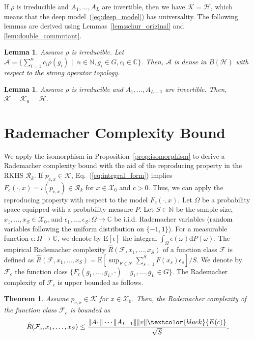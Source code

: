 \documentclass[twoside]{article}
\newtheorem{lemma}[proposition]{Lemma}
\newtheorem{theorem}[proposition]{Theorem}
\def\mcl#1{\mathcal{#1}}
\def\hil{\mcl{H}}
\def\mr{\mathrm}
\def\alg{\mcl{A}}
\def\red#1{\textcolor{black}{#1}}
\def\eqref#1{(\ref{#1})}
\begin{document}
If $\rho$ is irreducible and $A_1,\ldots,A_L$ are invertible, then we have $\mcl{K}=\hil$, which means that the deep model~\eqref{eq:deep_model} has universality.
The following lemmas are derived using Lemmas~\ref{lem:schur_original} and \ref{lem:double_commutant}.
\begin{lemma}\label{lem:schur}
Assume $\rho$ is irreducible.
Let $\alg=\{\sum_{i=1}^nc_i\rho(g_i)\,\mid\,n\in\mathbb{N}, g_i\in G, c_i\in\mathbb{C}\}$. 
Then, $\alg$ is dense in $B(\hil)$ with respect to the strong operator topology.
\end{lemma}

\begin{lemma}\label{lem:dense}
Assume $\rho$ is irreducible and $A_1,\ldots, A_{L-1}$ are invertible.
Then, $\mcl{K}=\overline{\mcl{K}_0}=\hil$.
\end{lemma}



\section{Rademacher Complexity Bound}\label{sec:rademacher}
We apply the isomorphism in Proposition~\ref{prop:isomorphism} to derive a Rademacher complexity bound with the aid of the reproducing property in the RKHS $\mcl{R}_k$.
If $p_{c,x}\in \mcl{K}$, Eq.~\eqref{eq:integral_form} implies $F_c(\cdot,x)=\iota(p_{c,x})\in\mcl{R}_k$ for $x\in\mcl{X}_0$ and $c>0$.
Thus, we can apply the reproducing property with respect to the model $F_c(\cdot,x)$.
Let $\Omega$ be a probability space equipped with a probability measure $P$.
Let $S\in\mathbb{N}$ be the sample size, $x_1,\ldots,x_S\in \mcl{X}_0$, and $\epsilon_1,\ldots,\epsilon_S:\Omega\to\mathbb{C}$ be i.i.d. Rademacher variables \red{(random variables following the uniform distribution on $\{-1,1\}$}).
For a measurable function $\epsilon:\Omega\to\mathbb{C}$, we denote by $\mr{E}[\epsilon]$ the integral $\int_{\Omega}\epsilon(\omega)\mr{d}P(\omega)$.
The empirical Rademacher complexity $\hat{R}(\mcl{F},x_1,\ldots,x_S)$ of a function class $\mcl{F}$ is defined as $\hat{R}(\mcl{F},x_1,\ldots,x_S)=\mr{E}[\sup_{F \in \mcl{F}} \sum_{s=1}^S F(x_s) \epsilon_s]/S$.
We denote by $\mcl{F}_c$ the function class $\{F_c(g_1,\ldots,g_L,\cdot)\,\mid\, g_1,\ldots,g_L\in G\}$.
The Rademacher complexity of $\mcl{F}_c$ is upper bounded as follows.

\begin{theorem}\label{thm:rademacher_unitary}
Assume $p_{c,x}\in\mcl{K}$ for $x\in \mcl{X}_0$. Then, the Rademacher complexity of the function class $\mcl{F}_c$ is bounded as
\begin{align*}
\hat{R}(\mcl{F}_c,x_1,\ldots,x_S)\le\frac{\Vert A_1\Vert\cdots \Vert A_{L-1}\Vert\Vert v\Vert\red{E(c)}}{\sqrt{S}}.
\end{align*} 
\end{theorem}
\end{document}
